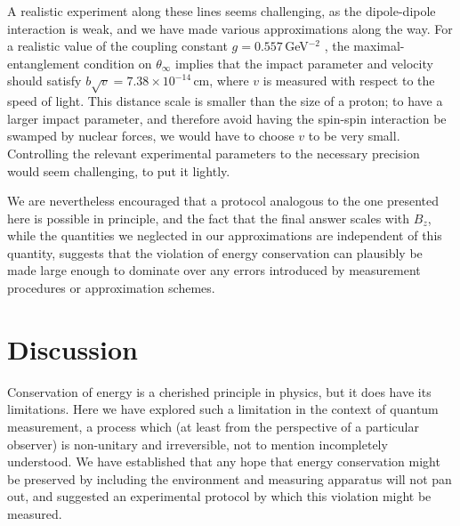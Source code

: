 \documentclass[12pt,aps,prd,onecolumn,nofootinbib,notitlepage]{revtex4-1}
\begin{document}
A realistic experiment along these lines seems challenging, as the dipole-dipole interaction is weak, and we have made various approximations along the way.
For a realistic value of the coupling constant $g= 0.557\,$GeV$^{-2}$ \cite{levitt2015, gamman, gammap}, the maximal-entanglement condition on $\theta_\infty$ implies that the impact parameter and velocity should satisfy $b\sqrt{v} = 7.38\times 10^{-14}\,$cm, where $v$ is measured with respect to the speed of light. 
This distance scale is smaller than the size of a proton; to have a larger impact parameter, and therefore avoid having the spin-spin interaction be swamped by nuclear forces, we would have to choose $v$ to be very small.
Controlling the relevant experimental parameters to the necessary precision would seem challenging, to put it lightly.

We are nevertheless encouraged that a protocol analogous to the one presented here is possible in principle, and the fact that the final answer scales with $B_z$, while the quantities we neglected in our approximations are independent of this quantity, suggests that the violation of energy conservation can plausibly be made large enough to dominate over any errors introduced by measurement procedures or approximation schemes.


\section{Discussion}

Conservation of energy is a cherished principle in physics, but it does have its limitations.
Here we have explored such a limitation in the context of quantum measurement, a process which (at least from the perspective of a particular observer) is non-unitary and irreversible, not to mention incompletely understood.
We have established that any hope that energy conservation might be preserved by including the environment and measuring apparatus will not pan out, and suggested an experimental protocol by which this violation might be measured.
\end{document}
